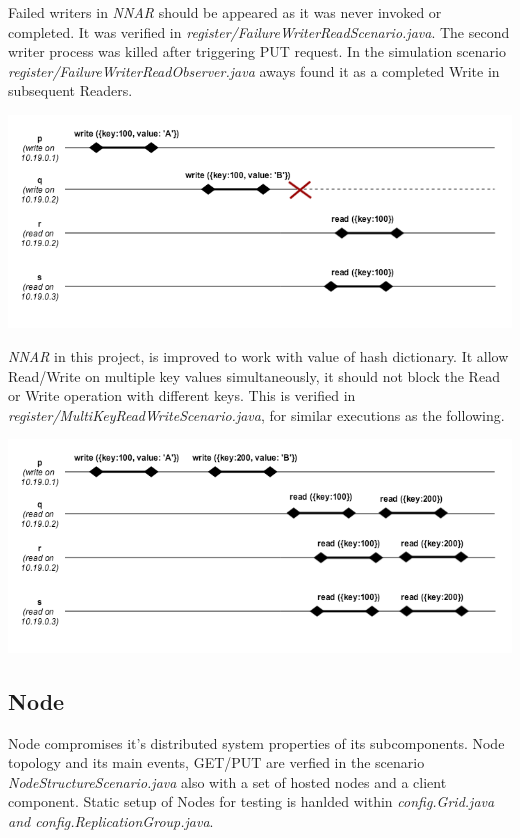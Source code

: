 \documentclass[a4paper, 11pt]{article}
\begin{document}
Failed writers in \textit{NNAR} should be appeared as it was never invoked or completed. It was verified in \textit{register/FailureWriterReadScenario.java}. The second writer process was killed after triggering PUT request. In the simulation scenario \textit{register/FailureWriterReadObserver.java} aways found it as a completed Write in subsequent Readers.


{\centering\includegraphics[scale = 0.5]{./images/failed_writer.png}\par}

\textit{NNAR} in this project, is improved to work with value of hash dictionary. It allow Read/Write on multiple key values simultaneously, it should not block the Read or Write operation with different keys. This is verified in \textit{register/MultiKeyReadWriteScenario.java}, for similar executions as the following.

{\centering\includegraphics[scale = 0.5]{./images/mkey_writes.png}\par}

\subsection{Node}

Node compromises it's distributed system properties of its subcomponents. Node topology and its main events, GET/PUT are verfied in the scenario \textit{NodeStructureScenario.java} also with a set of hosted nodes and a client component. Static setup of Nodes for testing is hanlded within \textit{config.Grid.java and config.ReplicationGroup.java}. 
\end{document}
